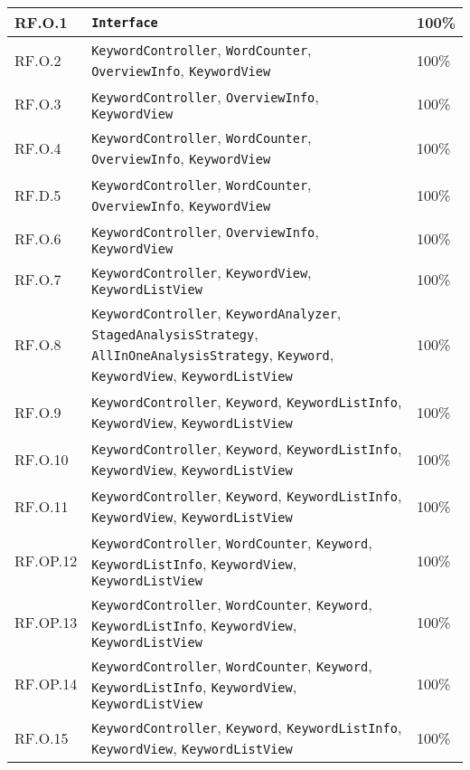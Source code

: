 \begin{tabularx}{\textwidth}{l >{\raggedright\arraybackslash}X l}
  \hline
  RF.O.1 & \texttt{Interface} & 100\% \\
  \hline 
  RF.O.2 & \texttt{KeywordController}, \texttt{WordCounter}, \texttt{OverviewInfo}, \texttt{KeywordView} & 100\% \\
  \hline 
  RF.O.3 & \texttt{KeywordController}, \texttt{OverviewInfo}, \texttt{KeywordView} & 100\% \\
  \hline 
  RF.O.4 & \texttt{KeywordController}, \texttt{WordCounter}, \texttt{OverviewInfo}, \texttt{KeywordView} & 100\% \\
  \hline 
  RF.D.5 & \texttt{KeywordController}, \texttt{WordCounter}, \texttt{OverviewInfo}, \texttt{KeywordView} & 100\% \\
  \hline 
  RF.O.6 & \texttt{KeywordController}, \texttt{OverviewInfo}, \texttt{KeywordView} & 100\% \\
  \hline 
  RF.O.7 & \texttt{KeywordController}, \texttt{KeywordView}, \texttt{KeywordListView} & 100\% \\
  \hline 
  RF.O.8 & \texttt{KeywordController}, \texttt{KeywordAnalyzer}, \texttt{StagedAnalysisStrategy}, \texttt{AllInOneAnalysisStrategy}, \texttt{Keyword}, \texttt{KeywordView}, \texttt{KeywordListView} & 100\% \\
  \hline 
  RF.O.9 & \texttt{KeywordController}, \texttt{Keyword}, \texttt{KeywordListInfo}, \texttt{KeywordView}, \texttt{KeywordListView} & 100\% \\
  \hline 
  RF.O.10 & \texttt{KeywordController}, \texttt{Keyword}, \texttt{KeywordListInfo}, \texttt{KeywordView}, \texttt{KeywordListView} & 100\% \\
  \hline 
  RF.O.11 & \texttt{KeywordController}, \texttt{Keyword}, \texttt{KeywordListInfo}, \texttt{KeywordView}, \texttt{KeywordListView} & 100\% \\
  \hline 
  RF.OP.12 & \texttt{KeywordController}, \texttt{WordCounter}, \texttt{Keyword}, \texttt{KeywordListInfo}, \texttt{KeywordView}, \texttt{KeywordListView} & 100\% \\
  \hline 
  RF.OP.13 & \texttt{KeywordController}, \texttt{WordCounter}, \texttt{Keyword}, \texttt{KeywordListInfo}, \texttt{KeywordView}, \texttt{KeywordListView} & 100\% \\
  \hline 
  RF.OP.14 & \texttt{KeywordController}, \texttt{WordCounter}, \texttt{Keyword}, \texttt{KeywordListInfo}, \texttt{KeywordView}, \texttt{KeywordListView} & 100\% \\
  \hline 
  RF.O.15 & \texttt{KeywordController}, \texttt{Keyword}, \texttt{KeywordListInfo}, \texttt{KeywordView}, \texttt{KeywordListView} & 100\% \\

\end{tabularx}
